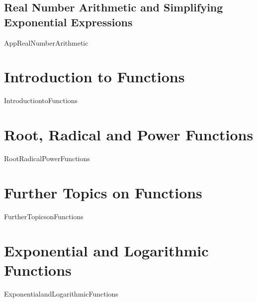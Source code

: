 \documentclass[11pt]{book}
\theoremstyle{definition}  %
\begin{document}
\section{Real Number Arithmetic and Simplifying Exponential Expressions}
{AppRealNumberArithmetic}

\chapter{Introduction to Functions}
\label{IntroductiontoFunctions}
\thispagestyle{empty}
{IntroductiontoFunctions}



\chapter{Root, Radical and Power Functions}
\label{RootRadicalPowerFunctions}
\thispagestyle{empty}
{RootRadicalPowerFunctions}

\chapter{Further Topics on Functions}
\label{FurtherTopicsonFunctions}
\thispagestyle{empty}
{FurtherTopicsonFunctions}

\chapter{Exponential and Logarithmic Functions}
\label{ExponentialandLogarithmicFunctions}
\thispagestyle{empty}
{ExponentialandLogarithmicFunctions}

\end{document}
